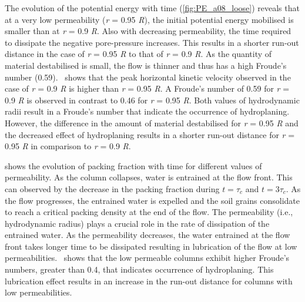 The evolution of the potential energy with time (\cref{fig:PE_a08_loose}) 
reveals that at a very low permeability (\textit{r} = 0.95 \textit{R}), the 
initial potential energy mobilised is smaller than at \textit{r} = 0.9 
\textit{R}. Also with decreasing permeability, the time required to 
dissipate the negative pore-pressure increases. This results in a shorter 
run-out distance in the case of \textit{r} = 0.95 \textit{R} to that of 
\textit{r} = 0.9 \textit{R}. As the quantity of material destabilised is small, 
the flow is thinner and thus has a high Froude's number 
(0.59).~ shows that the peak horizontal kinetic 
velocity observed in the case of \textit{r} = 0.9 \textit{R} is higher than 
\textit{r} = 0.95 \textit{R}. A Froude's number of 0.59 for \textit{r} = 0.9 
\textit{R} is observed in contrast to 0.46 for \textit{r} = 0.95 \textit{R}. 
Both values of hydrodynamic radii result in a Froude's number that indicate the 
occurrence of hydroplaning. However, the difference in the amount of material 
destabilised for \textit{r} = 0.95 \textit{R} and the decreased effect of 
hydroplaning results in a shorter run-out distance for \textit{r} = 0.95 
\textit{R} in comparison to \textit{r} = 0.9 \textit{R}.


 shows the evolution of packing 
fraction with time for different values of permeability. As the column 
collapses, water is entrained at the flow front. This can 
observed by the decrease in the packing fraction during $t = \tau_c$ and $t = 
3\tau_c$. As the flow progresses, the entrained water is expelled and the soil 
grains consolidate to reach a critical packing density at the end of the flow. 
The permeability (i.e., hydrodynamic radius) plays a crucial role in the rate 
of dissipation of the entrained water. As the permeability decreases, the water 
entrained at the flow front takes longer time to be dissipated resulting in 
lubrication of the flow at low permeabilities.~ shows 
that the low permeable columns exhibit higher Froude's numbers, greater than 
0.4, that indicates occurrence of hydroplaning. This lubrication effect results 
in an increase in the run-out distance for columns with low permeabilities.

